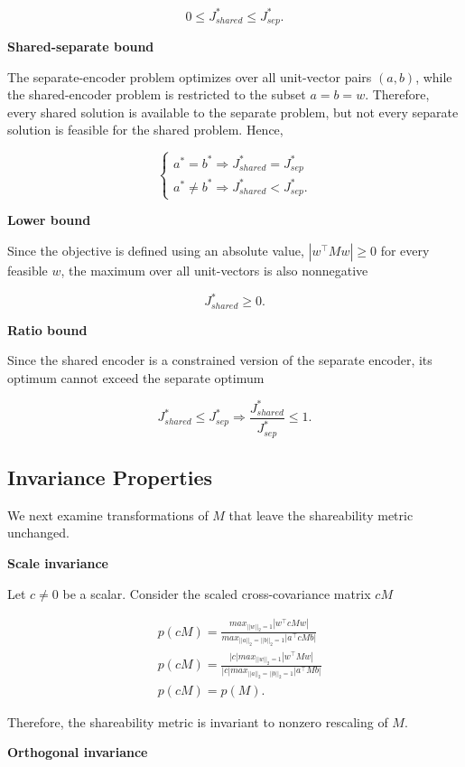\documentclass{article}
\begin{document}
\[
0 \leq J_{shared}^* \leq J_{sep}^*.
\]

\textbf{Shared-separate bound}

The separate-encoder problem optimizes over all unit-vector pairs \((a,b)\), while the shared-encoder problem is restricted to the subset \(a=b=w\). Therefore, every shared solution is available to the separate problem, but not every separate solution is feasible for the shared problem. Hence,

\[
\begin{cases} 
a^* = b^* \Rightarrow J_{shared}^* = J_{sep}^* \\ 
a^* \neq b^* \Rightarrow J_{shared}^* < J_{sep}^*.
\end{cases}
\]

\textbf{Lower bound}

Since the objective is defined using an absolute value, \(|w^\top M w| \geq 0\) for every feasible \(w\), the maximum over all unit-vectors is also nonnegative

\[
J_{shared}^* \geq 0.
\]

\textbf{Ratio bound}

Since the shared encoder is a constrained version of the separate encoder, its optimum cannot exceed the separate optimum

\[
J_{shared}^* \leq J_{sep}^* \Rightarrow \frac{J_{shared}^*}{J_{sep}^*} \leq 1.
\]

\subsection{Invariance Properties}

We next examine transformations of \(M\) that leave the shareability metric unchanged.

\textbf{Scale invariance}

Let \(c \neq 0\) be a scalar. Consider the scaled cross-covariance matrix \(cM\)

\[
\begin{aligned}
&p(cM) = \frac{max_{||w||_2=1}|w^\top cM w|}{max_{||a||_2 = ||b||_2 = 1} |a^\top cM b|} \\
&p(cM) = \frac{|c| max_{||w||_2=1}|w^\top M w|}{|c| max_{||a||_2 = ||b||_2 = 1} |a^\top M b|} \\
&p(cM)  = p(M).
\end{aligned}
\]

Therefore, the shareability metric is invariant to nonzero rescaling of \(M\).

\textbf{Orthogonal invariance}
\end{document}

